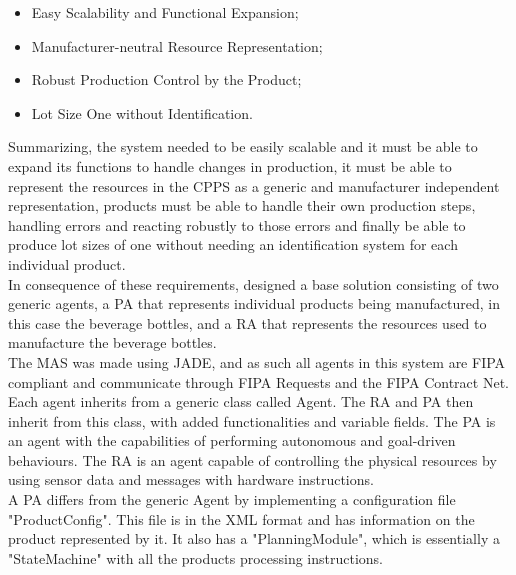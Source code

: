 \begin{itemize}
	\item Easy Scalability and Functional Expansion;
	\item Manufacturer-neutral Resource Representation;
	\item Robust Production Control by the Product;
	\item Lot Size One without Identification.
\end{itemize}

Summarizing, the system needed to be easily scalable and it must be able to expand its functions to handle changes in production, it must be able to represent the resources in the \acrshort{CPPS} as a generic and manufacturer independent representation, products must be able to handle their own production steps, handling errors and reacting robustly to those errors and finally be able to produce lot sizes of one without needing an identification system for each individual product.\\

In consequence of these requirements, \citeauthor{bottling_plant_part1} designed a base solution consisting of two generic agents, a \acrfull{PA} that represents individual products being manufactured, in this case the beverage bottles, and a \acrfull{RA} that represents the resources used to manufacture the beverage bottles.\\

The \acrshort{MAS} was made using \acrshort{JADE}, and as such all agents in this system are \acrshort{FIPA} compliant and communicate through \acrshort{FIPA} Requests and the \acrshort{FIPA} Contract Net.\\

Each agent inherits from a generic class called Agent. The \acrshort{RA} and \acrshort{PA} then inherit from this class, with added functionalities and variable fields. The \acrshort{PA} is an agent with the capabilities of performing autonomous and goal-driven behaviours. The \acrshort{RA} is an agent capable of controlling the physical resources by using sensor data and messages with hardware instructions.\\

A \acrshort{PA} differs from the generic Agent by implementing a configuration file "ProductConfig". This file is in the \acrshort{XML} format and has information on the product represented by it. It also has a "PlanningModule", which is essentially a "StateMachine" with all the products processing instructions.\\

